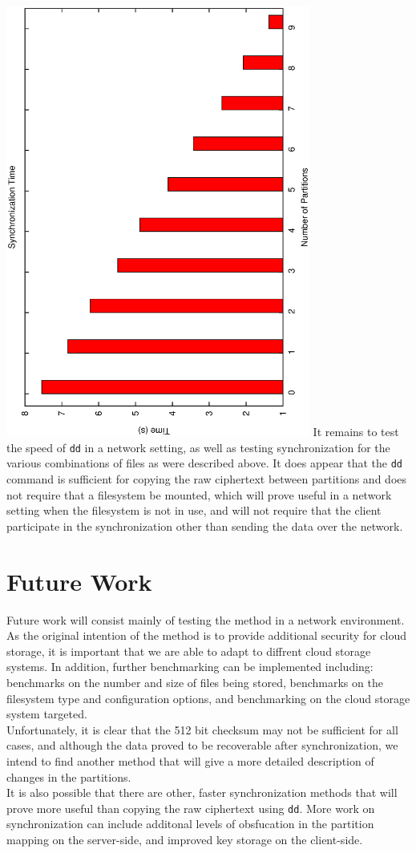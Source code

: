 \documentclass[12pt]{article}
\begin{document}
\includegraphics[width=10cm,angle=-90]{time.eps}
It remains to test the speed of \verb|dd| in a network setting, as well as testing synchronization for the various combinations of files as were described above. It does appear that the \verb|dd| command is sufficient for copying the raw ciphertext between partitions and does not require that a filesystem be mounted, which will prove useful in a network setting when the filesystem is not in use, and will not require that the client participate in the synchronization other than sending the data over the network.

\section{Future Work}
Future work will consist mainly of testing the method in a network environment. As the original intention of the method is to provide additional security for cloud storage, it is important that we are able to adapt to diffrent cloud storage systems. In addition, further benchmarking can be implemented including: benchmarks on the number and size of files being stored, benchmarks on the filesystem type and configuration options, and benchmarking on the cloud storage system targeted. 
~\\
Unfortunately, it is clear that the 512 bit checksum may not be sufficient for all cases, and although the data proved to be recoverable after synchronization, we intend to find another method that will give a more detailed description of changes in the partitions.
~\\ 
It is also possible that there are other, faster synchronization methods that will prove more useful than copying the raw ciphertext using \verb|dd|. More work on synchronization can include additonal levels of obsfucation in the partition mapping on the server-side, and improved key storage on the client-side.
\end{document}
